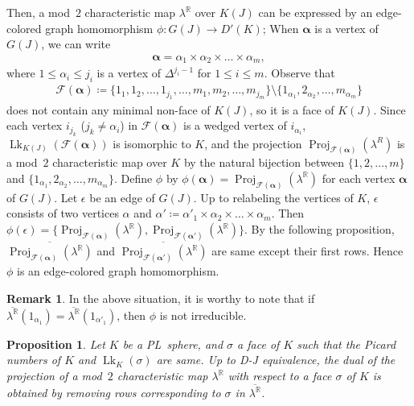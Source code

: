 \documentclass[11pt]{amsart}
\theoremstyle{plain}
\newtheorem{proposition}[theorem]{Proposition}
\numberwithin{equation}{section}
\theoremstyle{definition}
\newtheorem{remark}[theorem]{Remark}
\newcommand{\R}{\mathbb{R}}
\DeclareMathOperator{\lk}{Lk}
\DeclareMathOperator{\proj}{Proj}
\begin{document}
Then, a mod~$2$ characteristic map $\lambda^\R$ over $K(J)$ can be expressed by an edge-colored graph homomorphism $\phi \colon G(J) \to D'(K)$;
When $\bm{\alpha}$ is a vertex of $G(J)$, we can write
\begin{align*}
  \bm{\alpha} = \alpha_1 \times \alpha_2 \times \dots \times \alpha_m,
\end{align*}
where $1 \leq \alpha_i \leq j_i$ is a vertex of $\Delta^{j_i-1}$ for $1 \leq i \leq m$.
Observe that
\begin{align*}
  \mathcal{F}(\bm{\alpha}) \coloneqq \{1_1, 1_2, \ldots, 1_{j_1}, \ldots, m_1, m_2, \ldots, m_{j_m}\} \setminus \{1_{\alpha_1}, 2_{\alpha_2}, \ldots, m_{\alpha_m} \}
\end{align*} does not contain any minimal non-face of $K(J)$, so it is a face of $K(J)$.
Since each vertex $i_{j_k}$ ($j_k \not= \alpha_i$) in $\mathcal{F}(\bm{\alpha})$ is a wedged vertex of $i_{\alpha_i}$, $\lk_{K(J)}(\mathcal{F}(\bm{\alpha}))$ is isomorphic to $K$, and the projection $\proj_{\mathcal{F}(\bm{\alpha})}(\lambda^R)$ is a mod~$2$ characteristic map over $K$ by the natural bijection between $\{1, 2, \ldots, m\}$ and $\{1_{\alpha_1}, 2_{\alpha_2}, \ldots, m_{\alpha_m}\}$.
Define $\phi$ by $\phi(\bm{\alpha})=\proj_{\mathcal{F}(\bm{\alpha})}(\lambda^\R)$ for each vertex $\bm{\alpha}$ of $G(J)$.
Let $\epsilon$ be an edge of $G(J)$.
Up to relabeling the vertices of $K$, $\epsilon$ consists of two vertices $\alpha$ and $\alpha' \coloneqq \alpha'_1 \times \alpha_2 \times \dots \times \alpha_m$.
Then $\phi(\epsilon) = \{\proj_{\mathcal{F}(\bm{\alpha})}(\lambda^\R), \proj_{\mathcal{F}(\bm{\alpha'})}(\lambda^\R) \}$.
By the following proposition, $\overline{\proj_{\mathcal{F}(\bm{\alpha})}(\lambda^\R)}$ and $\overline{\proj_{\mathcal{F}(\bm{\alpha'})}(\lambda^\R)}$ are same except their first rows.
Hence $\phi$ is an edge-colored graph homomorphism.

\begin{remark} \label{rmk:reducible}
    In the above situation, it is worthy to note that if $\overline{\lambda^\R}(1_{\alpha_1}) = \overline{\lambda^\R}(1_{\alpha'_1})$, then  $\phi$ is not irreducible.
\end{remark}

\begin{proposition} \label{proposition: dual projection}
    Let $K$ be a PL~sphere, and $\sigma$ a face of $K$ such that the Picard numbers of $K$ and $\lk_K(\sigma)$ are same.
    Up to D-J equivalence, the dual of the projection of a mod~$2$ characteristic map $\lambda^\R$ with respect to a face $\sigma$ of $K$ is obtained by removing rows corresponding to $\sigma$ in $\overline{\lambda^\R}$.
\end{proposition}
\end{document}
